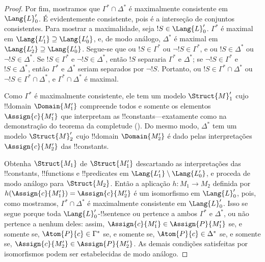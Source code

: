 \documentclass[../../../include/open-logic-section]{subfiles}
\begin{document}
\begin{proof}
Por fim, mostramos que $\Gamma^* \cap \Delta^*$ é maximalmente
consistente em $\Lang{L}'_0$. É evidentemente consistente, pois é a
interseção de conjuntos consistentes. Para mostrar a maximalidade, seja
$!S \in \Lang{L}'_0$. $\Gamma^*$ é maximal em
$\Lang{L'_1} \supseteq \Lang{L'_0}$, e, de modo análogo, $\Delta^*$ é
maximal em $\Lang{L'_2} \supseteq \Lang{L'_0}$. Segue-se que ou
$!S \in \Gamma^*$ ou $\lnot !S \in \Gamma^*$, e ou
$!S \in \Delta^*$ ou $\lnot !S \in \Delta^*$. Se $!S \in \Gamma^*$ e
$\lnot !S \in \Delta^*$, então $!S$ separaria $\Gamma^*$ e $\Delta^*$;
se $\lnot !S \in \Gamma^*$ e $!S \in \Delta^*$, então $\Gamma^*$ e
$\Delta^*$ seriam separados por $\lnot !S$. Portanto, ou
$!S \in \Gamma^* \cap \Delta^*$ ou
$\lnot !S \in \Gamma^* \cap \Delta^*$, e
$\Gamma^* \cap \Delta^*$ é maximal.

Como $\Gamma^*$ é maximalmente consistente, ele tem um modelo
$\Struct{M}'_1$ cujo !!{domain} $\Domain{M'_1}$ compreende todos e
somente os elementos $\Assign{c}{M'_1}$ que interpretam as
!!{constant}s---exatamente como na demonstração do teorema da
completude (). Do mesmo modo,
$\Delta^*$ tem um modelo $\Struct{M}'_2$ cujo !!{domain}
$\Domain{M'_2}$ é dado pelas interpretações $\Assign{c}{M'_2}$ das
!!{constant}s.

Obtenha $\Struct{M_1}$ de $\Struct{M'_1}$ descartando as interpretações
das !!{constant}s, !!{function}s e !!{predicate}s em
$\Lang{L'_1} \setminus \Lang{L'_0}$, e proceda de modo análogo para
$\Struct{M_2}$. Então a aplicação $h \colon M_1 \to M_2$ definida por
$h(\Assign{c}{M'_1}) = \Assign{c}{M'_2}$ é um isomorfismo em
$\Lang{L}'_0$, pois, como mostramos, $\Gamma^* \cap \Delta^*$ é
maximalmente consistente em $\Lang{L}'_0$. Isso se segue porque toda
$\Lang{L}'_0$-!!{sentence} ou pertence a ambos $\Gamma^*$ e
$\Delta^*$, ou não pertence a nenhum deles: assim,
$\Assign{c}{M'_1} \in \Assign{P}{M'_1}$ se, e somente se,
$\Atom{P}{c} \in \Gamma^*$ se, e somente se,
$\Atom{P}{c} \in \Delta^*$ se, e somente se,
$\Assign{c}{M'_2} \in \Assign{P}{M'_2}$. As demais condições
satisfeitas por isomorfismos podem ser estabelecidas de modo análogo.


\end{proof}
\end{document}
